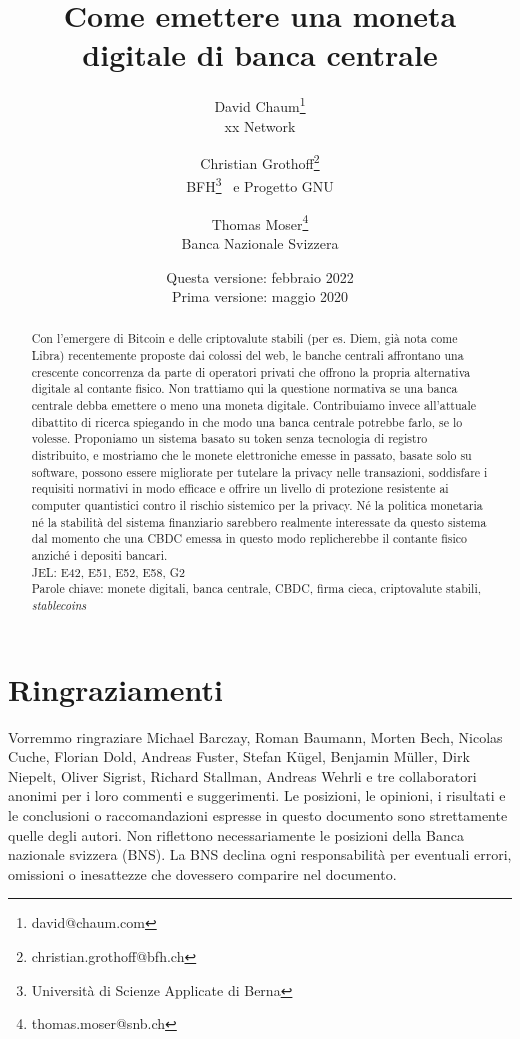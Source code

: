 \documentclass[a4paper]{article}
\title{Come emettere una moneta digitale di banca centrale}
\author{David Chaum\footnote{david@chaum.com} \\
  xx Network \and
  Christian Grothoff\footnote{christian.grothoff@bfh.ch} \\
  BFH\footnote{Università di Scienze Applicate di Berna}
  \ e Progetto GNU \and
  Thomas Moser\footnote{thomas.moser@snb.ch} \\
  Banca Nazionale Svizzera}
\date{Questa versione: febbraio 2022 \\
      Prima versione:  maggio 2020}
\begin{document}
\maketitle

\begin{abstract}
Con l'emergere di Bitcoin e delle criptovalute stabili (per es. Diem,
già nota come Libra) recentemente proposte dai colossi del web, le
banche centrali affrontano una crescente concorrenza da parte di
operatori privati che offrono la propria alternativa digitale al
contante fisico. Non trattiamo qui la questione normativa se una banca
centrale debba emettere o meno una moneta digitale. Contribuiamo invece
all'attuale dibattito di ricerca spiegando in che modo una banca centrale
potrebbe farlo, se lo volesse. Proponiamo un sistema basato su token
senza tecnologia di registro distribuito, e mostriamo che le monete
elettroniche emesse in passato, basate solo su software, possono essere
migliorate per tutelare la privacy nelle transazioni, soddisfare i
requisiti normativi in modo efficace e offrire un livello di protezione
resistente ai computer quantistici contro il rischio sistemico per
la privacy. Né la politica monetaria né la stabilità del sistema
finanziario sarebbero realmente interessate da questo sistema dal
momento che una CBDC emessa in questo modo replicherebbe il contante
fisico anziché i depositi bancari. \\

JEL: E42, E51, E52, E58, G2
\\

Parole chiave: monete digitali, banca centrale, CBDC, firma cieca,
criptovalute stabili, \textit{stablecoins}
\end{abstract}

\vspace{40pt}

\section*{Ringraziamenti}
Vorremmo ringraziare Michael Barczay, Roman Baumann, Morten Bech,
Nicolas Cuche, Florian Dold, Andreas Fuster, Stefan Kügel, Benjamin
Müller, Dirk Niepelt, Oliver Sigrist, Richard Stallman, Andreas Wehrli
e tre collaboratori anonimi per i loro commenti e suggerimenti. Le
posizioni, le opinioni, i risultati e le conclusioni o raccomandazioni
espresse in questo documento sono strettamente quelle degli autori.
Non riflettono necessariamente le posizioni della Banca nazionale
svizzera (BNS). La BNS declina ogni responsabilità per eventuali
errori, omissioni o inesattezze che dovessero comparire nel documento.
\end{document}
